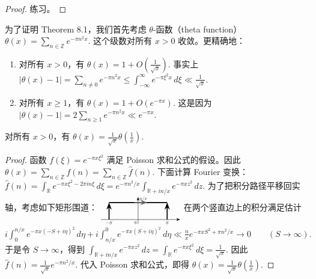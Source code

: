 \begin{proof}
	练习。
\end{proof}

为了证明 Theorem 8.1，我们首先考虑 $\theta$-函数（theta function）
\(\textstyle \theta(x)=\allowbreak{}\sum_{n\in\mathbb Z}e^{-\pi n^2 x}.\)
这个级数对所有 $x>0$ 收敛。更精确地：

\begin{enumerate}
	\item 对所有 $x>0$，有
	\(\textstyle \theta(x)=\allowbreak{}1+\allowbreak{}O\left(\frac{1}{\sqrt{x}}\right).\)
	事实上
	\(\textstyle |\theta(x)-1| =\allowbreak{} \sum_{n\neq0}e^{-\pi n^2x} \leq\allowbreak{} \int_{-\infty}^{\infty}e^{-\pi \xi^2 x}\,d\xi \ll\allowbreak{} \frac1{\sqrt x}.\)

	\item 对所有 $x\geq1$，有
	\(\textstyle \theta(x)=\allowbreak{}1+\allowbreak{}O(e^{-\pi x}).\)
	这是因为
	\(\textstyle |\theta(x)-1| =\allowbreak{} 2\sum_{n\geq1}e^{-\pi n^2x} \ll\allowbreak{} e^{-\pi x}.\)
\end{enumerate}

\begin{lemma}[原文 Lemma 8.3]
	对所有 $x>0$，有
	\(\textstyle \theta(x)=\allowbreak{}\frac{1}{\sqrt{x}}\theta\left(\frac1x\right).\)
\end{lemma}

\begin{proof}
	函数
	\(\textstyle f(\xi)=\allowbreak{}e^{-\pi x\xi^2}\)
	满足 Poisson 求和公式的假设。因此
	\(\textstyle \theta(x)=\allowbreak{}\sum_{n\in\mathbb Z}f(n) =\allowbreak{} \sum_{n\in\mathbb Z}\widehat f(n).\)
	下面计算 Fourier 变换：
	\(\textstyle \widehat f(n) =\allowbreak{} \int_{\mathbb R}e^{-\pi x\xi^2-2\pi in\xi}\,d\xi =\allowbreak{} e^{-\pi n^2/x} \int_{\mathbb R+\allowbreak{}in/x}e^{-\pi x z^2}\,dz.\)
	为了把积分路径平移回实轴，考虑如下矩形围道：
	\(\textstyle \begin{tikzpicture}[baseline=(current bounding box.center),scale=0.52,transform shape,>=Stealth] \draw[->] (-3.0,0) -- (3.4,0); \draw[->] (0,-0.35) -- (0,1.8); \node[below] at (-2.35,0) {$-S$}; \node[below] at (2.35,0) {$S$}; \node[below left] at (0,0) {$0$}; \node[above right] at (0,1.35) {$n/x$}; \draw[black,very thick,->] (-2.35,0) -- (-2.35,1.35); \draw[black,very thick,->] (2.35,0) -- (2.35,1.35); \draw[black,very thick] (-2.35,1.35) -- (2.35,1.35); \draw[black!60,very thick,->] (-0.3,1.35) -- (0.75,1.35); \end{tikzpicture}\)
	在两个竖直边上的积分满足估计
	\(\textstyle i\int_0^{n/x}e^{-\pi x(-S+\allowbreak{}i\eta)^2}\,d\eta +\allowbreak{} i\int_{n/x}^{0}e^{-\pi x(S+\allowbreak{}i\eta)^2}\,d\eta \ll\allowbreak{} \frac{n}{x}e^{-\pi xS^2+\allowbreak{}\pi n^2/x} \longrightarrow0 \qquad (S\to\allowbreak{}\infty).\)
	于是令 $S\to\infty$，得到
	\(\textstyle \int_{\mathbb R+\allowbreak{}in/x}e^{-\pi xz^2}\,dz =\allowbreak{} \int_{\mathbb R}e^{-\pi x\xi^2}\,d\xi =\allowbreak{} \frac{1}{\sqrt{x}}.\)
	因此
	\(\textstyle \widehat f(n)=\allowbreak{}\frac{1}{\sqrt{x}}e^{-\pi n^2/x}.\)
	代入 Poisson 求和公式，即得
	\(\textstyle \theta(x)=\allowbreak{}\frac{1}{\sqrt{x}}\theta\left(\frac1x\right).\)
\end{proof}

